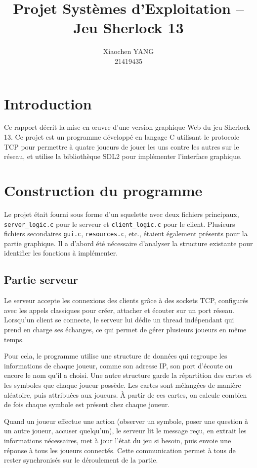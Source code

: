 \documentclass{article}
\title{Projet Systèmes d'Exploitation -- Jeu Sherlock 13}
\author{Xiaochen YANG\\21419435}
\date{}
\begin{document}
\maketitle

\section*{Introduction}

Ce rapport décrit la mise en œuvre d'une version graphique Web du jeu Sherlock 13. Ce projet est un programme développé 
en langage C utilisant le protocole TCP pour permettre à quatre joueurs de jouer les uns contre les autres sur le réseau, et utilise la bibliothèque SDL2 pour implémenter l'interface graphique.

\section{Construction du programme}

Le projet était fourni sous forme d'un squelette avec deux fichiers principaux, \texttt{server\_logic.c} pour le serveur et \texttt{client\_logic.c} pour le client.
Plusieurs fichiers secondaires \texttt{gui.c}, \texttt{resources.c}, etc., étaient également présents pour la partie graphique. 
Il a d'abord été nécessaire d'analyser la structure existante pour identifier les fonctions à implémenter.

\subsection{Partie serveur}

Le serveur accepte les connexions des clients grâce à des sockets TCP, configurés avec les appels classiques pour créer, attacher et écouter sur un port réseau. Lorsqu'un client se connecte, le serveur lui dédie un thread indépendant qui prend en charge ses échanges, ce qui permet de gérer plusieurs joueurs en même temps.

Pour cela, le programme utilise une structure de données qui regroupe les informations de chaque joueur, comme son adresse IP, son port d'écoute ou encore le nom qu'il a choisi. Une autre structure garde la répartition des cartes et les symboles que chaque joueur possède. Les cartes sont mélangées de manière aléatoire, puis attribuées aux joueurs. À partir de ces cartes, on calcule combien de fois chaque symbole est présent chez chaque joueur.

Quand un joueur effectue une action (observer un symbole, poser une question à un autre joueur, accuser quelqu'un), le serveur lit le message reçu, en extrait les informations nécessaires, met à jour l'état du jeu si besoin, puis envoie une réponse à tous les joueurs connectés. Cette communication permet à tous de rester synchronisés sur le déroulement de la partie.
\end{document}
